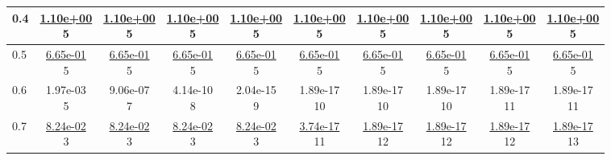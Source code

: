 \begin{table}[H]
\begin{tabular}{|l||c|c|c|c|c|c|c|c|c|}
\hline
 0.4 & \makecell{\ul{1.10e+00} \\ 5} & \makecell{\ul{1.10e+00} \\ 5} & \makecell{\ul{1.10e+00} \\ 5} & \makecell{\ul{1.10e+00} \\ 5} & \makecell{\ul{1.10e+00} \\ 5} & \makecell{\ul{1.10e+00} \\ 5} & \makecell{\ul{1.10e+00} \\ 5} & \makecell{\ul{1.10e+00} \\ 5} & \makecell{\ul{1.10e+00} \\ 5} \\
\hline
 0.5 & \makecell{\ul{6.65e-01} \\ 5} & \makecell{\ul{6.65e-01} \\ 5} & \makecell{\ul{6.65e-01} \\ 5} & \makecell{\ul{6.65e-01} \\ 5} & \makecell{\ul{6.65e-01} \\ 5} & \makecell{\ul{6.65e-01} \\ 5} & \makecell{\ul{6.65e-01} \\ 5} & \makecell{\ul{6.65e-01} \\ 5} & \makecell{\ul{6.65e-01} \\ 5} \\
\hline
 0.6 & \makecell{1.97e-03 \\ 5} & \makecell{9.06e-07 \\ 7} & \makecell{4.14e-10 \\ 8} & \makecell{2.04e-15 \\ 9} & \makecell{1.89e-17 \\ 10} & \makecell{1.89e-17 \\ 10} & \makecell{1.89e-17 \\ 10} & \makecell{1.89e-17 \\ 11} & \makecell{1.89e-17 \\ 11} \\
\hline
 0.7 & \makecell{\ul{8.24e-02} \\ 3} & \makecell{\ul{8.24e-02} \\ 3} & \makecell{\ul{8.24e-02} \\ 3} & \makecell{\ul{8.24e-02} \\ 3} & \makecell{\ul{3.74e-17} \\ 11} & \makecell{\ul{1.89e-17} \\ 12} & \makecell{\ul{1.89e-17} \\ 12} & \makecell{\ul{1.89e-17} \\ 12} & \makecell{\ul{1.89e-17} \\ 13} \\

\end{tabular}
\end{table}
